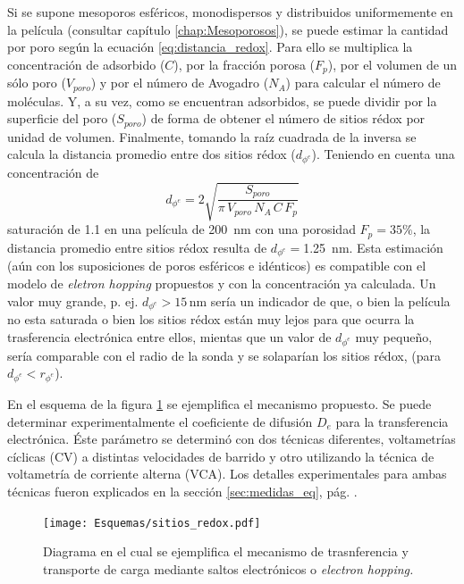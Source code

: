 	 	 Si se supone mesoporos esféricos, monodispersos y distribuidos uniformemente en la película (consultar capítulo \ref{chap:Mesoporosos}), se puede estimar la cantidad \ru\space por poro según la ecuación \ref{eq:distancia_redox}. Para ello se multiplica la concentración de \ru\space adsorbido ($C$), por la fracción porosa ($F_p$), por el volumen de un sólo poro ($V_{poro}$) y por el número de Avogadro ($N_{A}$) para calcular el número de moléculas. Y, a su vez, como se encuentran adsorbidos, se puede dividir por la superficie del poro ($S_{poro}$) de forma de obtener el número de sitios rédox por unidad de volumen. Finalmente, tomando la raíz cuadrada de la inversa se calcula la distancia promedio entre dos sitios rédox ($d_{\phi^{e}}$). Teniendo en cuenta una concentración de \linebreak
	 		\begin{equation}
					d_{\phi^{e}}=2\sqrt{\frac{S_{poro}}{\pi\, V_{poro}\, N_A\, C\, F_p}}
					\label{eq:distancia_redox}
			\end{equation}
	     saturación de \SI{1,1}{\Molar} en una película de \SI{200}{nm} con una porosidad $F_p=35\%$, la distancia promedio entre sitios rédox resulta de $d_{\phi^{e}}=$\SI{1.25}{nm}. Esta estimación (aún con los suposiciones de poros esféricos e idénticos) es compatible con el modelo de \textit{eletron hopping} propuestos y con la concentración ya calculada. Un valor muy grande, p. ej. $d_{\phi^{e}}>15\, \text{nm}$ sería un indicador de que, o bien la película no esta saturada o bien los sitios rédox están muy lejos para que ocurra la trasferencia electrónica entre ellos, mientas que un valor de $d_{\phi^{e}}$ muy pequeño, sería comparable con el radio de la sonda y se solaparían los sitios rédox, (para $d_{\phi^{e}} < r_{\phi^{e}}$). 
	
	     En el esquema de la figura \ref{fig:sitios_redox} se ejemplifica el mecanismo propuesto. Se puede determinar experimentalmente el coeficiente de difusión $D_e$ para la transferencia electrónica. Éste parámetro se determinó con dos técnicas diferentes, voltametrías cíclicas (CV) a distintas velocidades de barrido y otro utilizando la técnica de voltametría de corriente alterna (VCA). Los detalles experimentales para ambas técnicas fueron explicados en la sección \ref{sec:medidas_eq}, pág. \pageref{sec:medidas_eq}.
			\begin{figure}[ht!]
					\centering
			 	    \texttt{[image: Esquemas/sitios\_redox.pdf]}
			        \caption[Mecanismo de transferencia de electrones]{Diagrama en el cual se ejemplifica el mecanismo de trasnferencia y transporte de carga mediante saltos electrónicos o \textit{electron hopping.}}
			        \label{fig:sitios_redox}
			      	\end{figure} 

